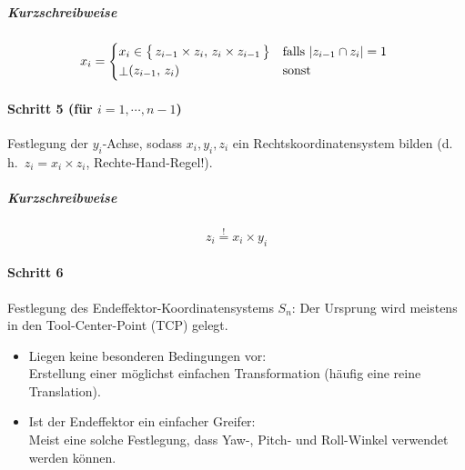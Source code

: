 \documentclass[a4paper, 11pt, accentcolor = tud3b]{tudreport}
\renewcommand{\dh}{d.\,h.~}
\begin{document}
						\subparagraph{Kurzschreibweise}
						\begin{equation*}
							x_i =
								\begin{cases*}
									x_i \in \big\{\, z_{i - 1} \times z_i,\, z_i \times z_{i - 1} \,\big\} & falls \( \lvert z_{i - 1} \cap z_i \rvert = 1 \) \\
									\raisebox{-1pt}{\(\bot\)}(z_{i - 1},\, z_i) & sonst
								\end{cases*}
						\end{equation*}
					
					\paragraph{Schritt 5 (für \( i = 1, \cdots, n - 1 \))}
						Festlegung der \(y_i\)-Achse, sodass \( x_i, y_i, z_i \) ein Rechtskoordinatensystem bilden (\dh \( z_i = x_i \times z_i \), Rechte-Hand-Regel!).
						
						\subparagraph{Kurzschreibweise}
						\begin{equation*}
							z_i \overset{!}{=} x_i \times y_i
						\end{equation*}
					
					\paragraph{Schritt 6}
						Festlegung des Endeffektor-Koordinatensystems \(S_n\): Der Ursprung wird meistens in den Tool-Center-Point (TCP) gelegt.
						\begin{itemize}
							\item Liegen keine besonderen Bedingungen vor: \\ Erstellung einer möglichst einfachen Transformation (häufig eine reine Translation).
							\item Ist der Endeffektor ein einfacher Greifer: \\ Meist eine solche Festlegung, dass Yaw-, Pitch- und Roll-Winkel verwendet werden können.
						\end{itemize}
					
\end{document}
